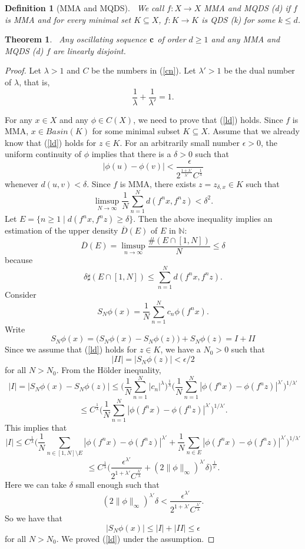\documentclass[12pt,letterpaper]{amsart}
\newtheorem {theorem}{Theorem}
\newtheorem {definition}{Definition}
\newcommand {\N} {{\mathbb N}}
\begin{document}
\medskip
\begin{definition}[MMA and MQDS]~\label{mmamqdsd}
We call $f: X\to X$ MMA and MQDS (d) if $f$ is MMA and for every minimal set $K\subseteq X$, $f: K\to K$ is QDS (k)
for some $k\leq d$.
\end{definition}

\medskip
\begin{theorem}~\label{main3}
Any oscillating sequence ${\bf c}$ of order $d\geq 1$ and any MMA and MQDS (d) $f$ are linearly disjoint.
\end{theorem}
 
\begin{proof}
Let $\lambda > 1$ and $C$ be the numbers in (\ref{cn}). Let $\lambda'> 1$ be the dual number of $\lambda$, that is, 
$$
\frac{1}{\lambda} + \frac{1}{\lambda'}=1.
$$

For any $x\in X$ and any $\phi\in C(X)$, we need to prove that (\ref{ld}) holds. 
Since $f$ is MMA, $x\in Basin (K)$ for some minimal subset $K\subseteq X$. 
Assume that we already know that (\ref{ld}) holds for $z\in K$. For an arbitrarily small number $\epsilon >0$, 
the uniform continuity of $\phi$ implies that there is a $\delta >0$ such that 
$$
|\phi(u)- \phi(v)| <\frac{\epsilon}{2^{\frac{1+\lambda'}{\lambda'}} C^{\frac{1}{\lambda}}}
$$ 
whenever $d(u, v)<\delta$.
Since $f$ is MMA, there exists $z=z_{\delta,x}\in K$
such that
  \begin{equation*}\label{MA2}
  \limsup_{N\to\infty} \frac{1}{N} \sum_{n=1}^{N} d(f^n x, f^n z) <\delta^2.
\end{equation*}
Let $E=\{n\ge 1\;|\; d(f^n x, f^n z)\ge \delta\}$. Then the above inequality implies an estimation of the upper density $\overline{D}(E)$ of $E$ in $\N$:
$$
\overline{D}(E)=\limsup_{n\to \infty} \frac{\#(E\cap [1,N])}{N} \le \delta
$$
because
$$
 \delta \sharp (E\cap [1, N]) \le \sum_{n=1}^{N} d(f^n x, f^n z).
$$
Consider 
$$
S_N\phi(x)=\frac{1}{N} \sum_{n=1}^{N} c_{n} \phi (f^{n}x).
$$
Write
$$
   S_N\phi(x) = \Big( S_N\phi(x) - S_N\phi(z)\Big) + S_N\phi(z) =I+II
$$
Since we assume that (\ref{ld}) holds for $z\in K$, we have a $N_{0}>0$ such that 
$$
|II|=|S_N\phi(z)|<\epsilon/2
$$ 
for all $N>N_{0}$. From the H\"{o}lder inequality,  
$$
|I|= |S_N\phi (x) - S_N \phi (z)| \leq \Big( \frac{1}{N} \sum_{n=1}^{N} |c_{n}|^{\lambda} \Big)^{\frac{1}{\lambda}} \Big(\frac{1}{N} \sum_{n=1}^{N} |\phi(f^n x) - \phi(f^n z)|^{\lambda'}\Big)^{1/\lambda'}
$$
$$
\leq C^{\frac{1}{\lambda}} \Big(\frac{1}{N} \sum_{n=1}^{N} |\phi(f^n x) - \phi(f^n z)|^{\lambda'}\Big)^{1/\lambda'}.
 $$
This implies that 
$$
|I|\leq C^{\frac{1}{\lambda}} \Big( \frac{1}{N} \sum_{n\in [1,N]\setminus E} |\phi(f^n x) - \phi(f^n z)|^{\lambda'} +\frac{1}{N} \sum_{n\in E} |\phi(f^n x) - \phi(f^n z)|^{\lambda'}\Big)^{1/\lambda'} 
$$
$$
\leq C^{\frac{1}{\lambda}} \Big( \frac{\epsilon^{\lambda'}}{2^{1+\lambda'} C^{\frac{\lambda'}{\lambda}}} +(2\|\phi\|_{\infty})^{\lambda'}\delta\Big)^{\frac{1}{\lambda'}}.
$$
Here we can take $\delta$ small enough such that 
$$
(2\|\phi\|_{\infty})^{\lambda'}\delta < \frac{\epsilon^{\lambda'}}{2^{1+\lambda'} C^{\frac{\lambda'}{\lambda}}}.
$$ 
So we have that 
$$
|S_N\phi (x)|\leq |I|+|II|\leq \epsilon
$$
for all $N>N_{0}$. We proved (\ref{ld}) under the assumption.


\end{proof}
\end{document}

